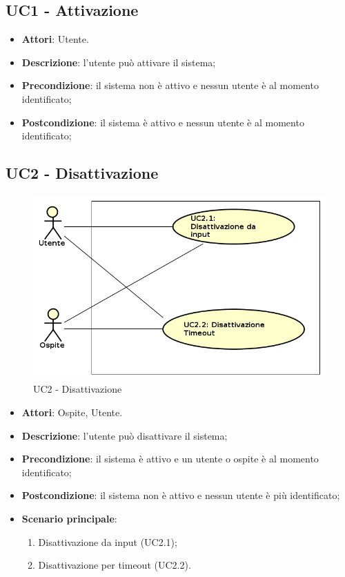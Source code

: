 \documentclass[../AnalisiDeiRequisiti.tex]{subfiles}
\begin{document}
\subsection{UC1 - Attivazione} 
\label{sssec:UC1}
\begin{itemize} 
\item \textbf{Attori}: Utente.
\item \textbf{Descrizione}: l'utente può attivare il sistema;
\item \textbf{Precondizione}: il sistema non è attivo e nessun utente è al momento identificato;
\item \textbf{Postcondizione}: il sistema è attivo e nessun utente è al momento identificato;
\end{itemize} 
\subsection{UC2 - Disattivazione} 
\label{sssec:UC2}
\begin{figure}[!h]
	\centering
	\includegraphics[width=\textwidth]{UseCases/UC2_Disattivazione/UC2_Disattivazione.png}
	\caption{UC2 - Disattivazione}
\end{figure}
\begin{itemize} 
\item \textbf{Attori}: Ospite, Utente.
\item \textbf{Descrizione}: l'utente può disattivare il sistema;
\item \textbf{Precondizione}: il sistema è attivo e un utente o ospite è al momento identificato;
\item \textbf{Postcondizione}: il sistema non è attivo e nessun utente è più identificato;
\item \textbf{Scenario principale}: \begin{enumerate}\item Disattivazione da input (UC2.1);\item Disattivazione per timeout (UC2.2). 
 \end{enumerate}
\end{itemize} 
\end{document}
